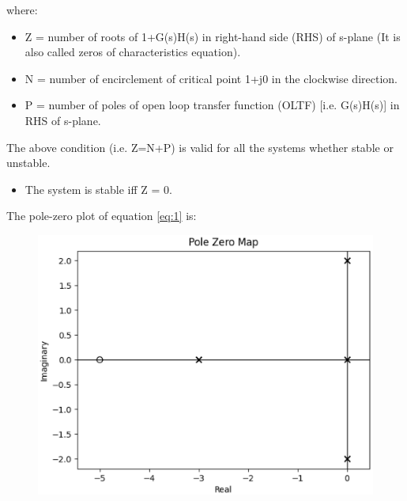 \begin{enumerate}[label=\thesubsection.\arabic*.,ref=\thesubsection.\theenumi]
where:
\begin{itemize}
    \item  Z = number of roots of 1+G(s)H(s) in right-hand side (RHS) of s-plane (It is also called zeros of characteristics equation).
    \item N = number of encirclement of critical point 1+j0 in the clockwise direction.
    \item P = number of poles of open loop transfer function (OLTF) [i.e. G(s)H(s)] in RHS of s-plane.
\end{itemize}
The above condition (i.e. Z=N+P) is valid for all the systems whether stable or unstable. 
\begin{itemize}
    \item The system is stable iff Z = 0.
\end{itemize}
The pole-zero plot of equation \ref{eq:1} is:
\begin{figure}[ht!]
        \includegraphics[width=\columnwidth]{./figs/ee18btech11025/pzG.eps}
        \caption{}
        \label{fig:pz}
\end{figure}


\end{enumerate}
